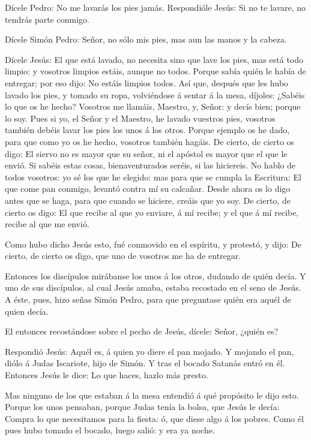  Dícele Pedro: No me lavarás los pies jamás. Respondióle
Jesús: Si no te lavare, no tendrás parte conmigo.

 Dícele Simón Pedro: Señor, no sólo mis pies, mas aun las
manos y la cabeza.

 Dícele Jesús: El que está lavado, no necesita sino que
lave los pies, mas está todo limpio: y vosotros limpios estáis, aunque
no todos.  Porque sabía quién le había de entregar; por eso
dijo: No estáis limpios todos.  Así que, después que les
hubo lavado los pies, y tomado su ropa, volviéndose á sentar á la mesa,
díjoles: ¿Sabéis lo que os he hecho?  Vosotros me llamáis,
Maestro, y, Señor: y decís bien; porque lo soy.  Pues si
yo, el Señor y el Maestro, he lavado vuestros pies, vosotros también
debéis lavar los pies los unos á los otros.  Porque ejemplo
os he dado, para que como yo os he hecho, vosotros también hagáis.
 De cierto, de cierto os digo: El siervo no es mayor que su
señor, ni el apóstol es mayor que el que le envió.  Si
sabéis estas cosas, bienaventurados seréis, si las hiciereis.
 No hablo de todos vosotros: yo sé los que he elegido: mas
para que se cumpla la Escritura: El que come pan conmigo, levantó contra
mí su calcañar.  Desde ahora os lo digo antes que se haga,
para que cuando se hiciere, creáis que yo soy.  De cierto,
de cierto os digo: El que recibe al que yo enviare, á mí recibe; y el
que á mí recibe, recibe al que me envió.

 Como hubo dicho Jesús esto, fué conmovido en el espíritu,
y protestó, y dijo: De cierto, de cierto os digo, que uno de vosotros me
ha de entregar.

 Entonces los discípulos mirábanse los unos á los otros,
dudando de quién decía.  Y uno de sus discípulos, al cual
Jesús amaba, estaba recostado en el seno de Jesús.  A éste,
pues, hizo señas Simón Pedro, para que preguntase quién era aquél de
quien decía.

 El entonces recostándose sobre el pecho de Jesús, dícele:
Señor, ¿quién es?

 Respondió Jesús: Aquél es, á quien yo diere el pan mojado.
Y mojando el pan, diólo á Judas Iscariote, hijo de Simón. 
Y tras el bocado Satanás entró en él. Entonces Jesús le dice: Lo que
haces, hazlo más presto.

 Mas ninguno de los que estaban á la mesa entendió á qué
propósito le dijo esto.  Porque los unos pensaban, porque
Judas tenía la bolsa, que Jesús le decía: Compra lo que necesitamos para
la fiesta: ó, que diese algo á los pobres.  Como él pues
hubo tomado el bocado, luego salió: y era ya noche.

